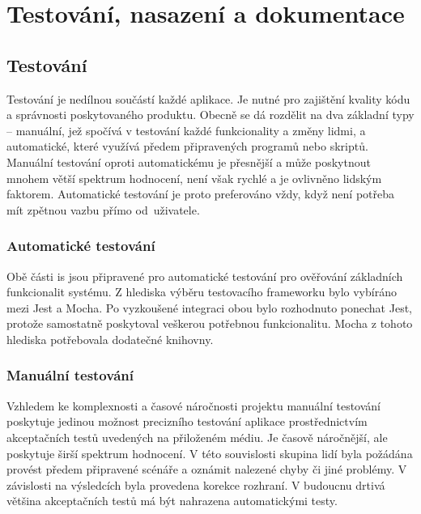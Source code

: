 \chapter{Testování, nasazení a dokumentace}




\section{Testování}

Testování je nedílnou součástí každé aplikace. Je nutné pro zajištění kvality kódu a správnosti poskytovaného produktu. Obecně se dá rozdělit na dva základní typy -- manuální, jež spočívá v testování každé funkcionality a změny lidmi, a automatické, které využívá předem připravených programů nebo skriptů. Manuální testování oproti automatickému je přesnější a může poskytnout mnohem větší spektrum hodnocení, není však rychlé a je ovlivněno lidským faktorem. Automatické testování je proto preferováno vždy, když není potřeba mít zpětnou vazbu přímo od~uživatele.


\subsection{Automatické testování}

Obě části \gls{is} jsou připravené pro automatické testování pro ověřování základních funkcionalit systému. Z hlediska výběru testovacího frameworku bylo vybíráno mezi Jest a Mocha. Po vyzkoušené integraci obou bylo rozhodnuto ponechat Jest, protože samostatně poskytoval veškerou potřebnou funkcionalitu. Mocha z tohoto hlediska potřebovala dodatečné knihovny.


\subsection{Manuální testování}

Vzhledem ke komplexnosti a časové náročnosti projektu manuální testování poskytuje jedinou možnost precizního testování aplikace prostřednictvím akceptačních testů uvedených na přiloženém médiu. Je časově náročnější, ale poskytuje širší spektrum hodnocení. V této souvislosti skupina lidí byla požádána provést předem připravené scénáře a oznámit nalezené chyby či jiné problémy. V závislosti na výsledcích byla provedena korekce rozhraní. V budoucnu drtivá většina akceptačních testů má být nahrazena automatickými testy.


